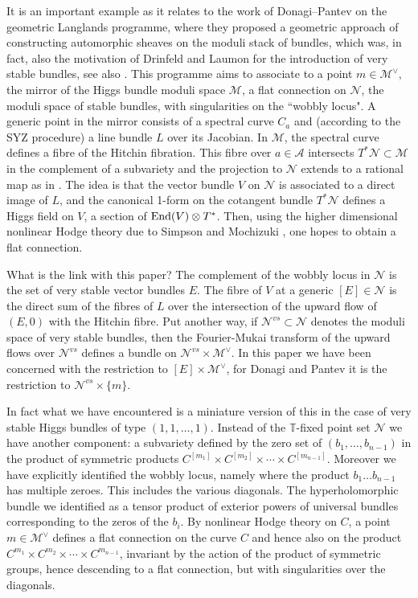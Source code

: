 \documentclass[12pt]{article}
\numberwithin{equation}{section}
\theoremstyle{remark}
\theoremstyle{definition}
\numberwithin{theorem}{section}
\newcommand{\T}{{\mathbb{T}}}
\newcommand{\End}{\textnormal{End}}
\renewcommand{\1}{\mathbbm{1}}
\begin{document}
It is an important example as  it relates to the work of Donagi--Pantev \cite{DP} on the 
geometric Langlands programme, where they proposed a geometric approach of constructing automorphic sheaves on the moduli stack of bundles, which was, in fact, also the motivation of  Drinfeld \cite{drinfeld} and Laumon \cite{laumon} for the introduction of very stable bundles, see also \cite[Conjecture 6.2.1]{laumon2}. This programme aims to associate to a point  $m\in {\mathcal M}^{\vee}$, the mirror of the Higgs bundle moduli space ${\mathcal M}$, a flat connection on ${\mathcal N}$, the moduli space of stable bundles, with singularities on the ``wobbly locus". A generic point in the mirror consists of a spectral curve $C_a$ and (according to the SYZ procedure) a line bundle $L$ over its Jacobian. In ${\mathcal M}$, the spectral curve defines a fibre of the Hitchin fibration. This fibre over $a\in {\mathcal A}$ intersects $T^*{\mathcal N}\subset {\mathcal M}$ in the complement of a subvariety and the projection to ${\mathcal N}$ extends to a rational map as in \cite{beauville-etal}. The idea is that the vector bundle $V$ on ${\mathcal N}$ is associated to a direct image of $L$, and the canonical 
1-form on the cotangent bundle $T^*{\mathcal N}$ defines a Higgs field on $V$, a section of $\End (V)\otimes T^*$. Then, using the higher dimensional nonlinear Hodge theory due to Simpson and  Mochizuki \cite{mochizuki}, one hopes to obtain a flat connection.  

What is the link with this paper? The complement of the wobbly locus in ${\mathcal N}$ is the set of very stable vector bundles $E$. The fibre of $V$  at a generic $[E]\in {\mathcal N}$ is the direct sum of the fibres of $L$ over the intersection of the upward flow of $(E,0)$ with the Hitchin fibre. Put another way, if ${\mathcal N}^{vs}\subset {\mathcal N}$ denotes the moduli space of very stable bundles, then the Fourier-Mukai transform of the upward flows over  ${\mathcal N}^{vs}$
defines a bundle on ${\mathcal N}^{vs}\times {\mathcal M}^{\vee}$. In this paper we have been concerned with the restriction to $[E]\times {\mathcal M}^{\vee}$, for Donagi and Pantev it is the restriction to ${\mathcal N}^{vs}\times \{m\}$.

In fact what we have encountered is a miniature version of this in the case of very stable Higgs bundles of type $(1,1,\dots, 1)$. Instead of the $\T$-fixed point set ${\mathcal N}$ we have another component: a subvariety defined by the zero set of $(b_1,\dots, b_{n-1})$ in the product of symmetric products $C^{[m_1]}\times C^{[m_2]}\times \cdots \times C^{[m_{n-1}]}$. Moreover we have explicitly  identified  the wobbly locus, namely where the product $b_1\dots b_{n-1}$ has multiple zeroes. This  includes the various diagonals. The hyperholomorphic bundle we identified as a tensor product of exterior powers of universal bundles corresponding to the zeros of the $b_i$. By nonlinear Hodge theory on $C$, a point $m\in {\mathcal M}^{\vee}$ defines a flat connection on the curve $C$ and hence also on the product $C^{m_1}\times C^{m_2}\times \cdots \times C^{m_{n-1}}$, invariant by the action of the product of symmetric groups, hence descending to a flat connection, but with singularities over the diagonals.
\end{document}

